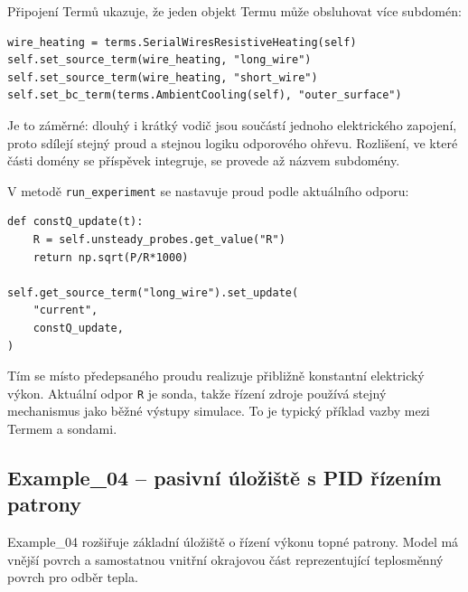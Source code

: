 \documentclass[a4paper,11pt]{article}
\begin{document}
Připojení Termů ukazuje, že jeden objekt Termu může obsluhovat více subdomén:

\begin{lstlisting}[style=py]
wire_heating = terms.SerialWiresResistiveHeating(self)
self.set_source_term(wire_heating, "long_wire")
self.set_source_term(wire_heating, "short_wire")
self.set_bc_term(terms.AmbientCooling(self), "outer_surface")
\end{lstlisting}

Je to záměrné: dlouhý i krátký vodič jsou součástí jednoho elektrického zapojení,
proto sdílejí stejný proud a stejnou logiku odporového ohřevu. Rozlišení, ve
které části domény se příspěvek integruje, se provede až názvem subdomény.

V metodě \texttt{run\_experiment} se nastavuje proud podle aktuálního odporu:

\begin{lstlisting}[style=py]
def constQ_update(t):
    R = self.unsteady_probes.get_value("R")
    return np.sqrt(P/R*1000)

self.get_source_term("long_wire").set_update(
    "current",
    constQ_update,
)
\end{lstlisting}

Tím se místo předepsaného proudu realizuje přibližně konstantní elektrický výkon.
Aktuální odpor \texttt{R} je sonda, takže řízení zdroje používá stejný mechanismus
jako běžné výstupy simulace. To je typický příklad vazby mezi Termem a sondami.

\subsection*{Example\_04 -- pasivní úložiště s PID řízením patrony}

Example\_04 rozšiřuje základní úložiště o řízení výkonu topné patrony. Model má
vnější povrch a samostatnou vnitřní okrajovou část reprezentující teplosměnný
povrch pro odběr tepla.
\end{document}
